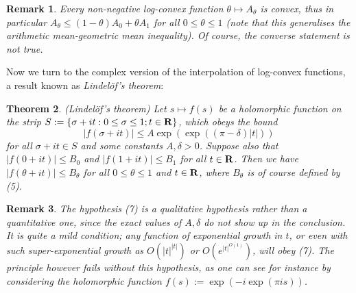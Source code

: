 \documentclass[10pt,reqno]{amsart}
\newtheorem{theorem}{Theorem}
\newtheorem{remark}[theorem]{Remark}
\begin{document}
\begin{remark}
    Every non-negative log-convex function $\theta \mapsto A_\theta$ is convex, thus in particular $A_\theta \leq (1-\theta) A_0 + \theta A_1$ for all $0 \leq \theta \leq 1$ (note that this generalises the arithmetic mean-geometric mean inequality). Of course, the converse statement is not true. 
\end{remark}

Now we turn to the complex version of the interpolation of log-convex functions, a result known as \emph{Lindelöf’s theorem}:

\begin{theorem}
    (Lindelöf’s theorem) Let $s \mapsto f(s)$ be a holomorphic function on the strip $S := \{ \sigma+it: 0 \leq \sigma \leq 1; t \in {\bf R} \}$, which obeys the bound
    \begin{equation}     |f(\sigma+it)| \leq A \exp( \exp( (\pi - \delta) |t|) ) \end{equation}
    for all $\sigma+it \in S$ and some constants $A, \delta > 0$. Suppose also that $|f(0+it)| \leq B_0$ and $|f(1+it)| \leq B_1$ for all $t \in {\bf R}$. Then we have $|f(\theta+it)| \leq B_\theta$ for all $0 \leq \theta \leq 1$ and $t \in {\bf R}$, where $B_\theta$ is of course defined by (5). 
\end{theorem}

\begin{remark}
    The hypothesis (7) is a qualitative hypothesis rather than a quantitative one, since the exact values of $A, \delta$ do not show up in the conclusion. It is quite a mild condition; any function of exponential growth in $t$, or even with such super-exponential growth as $O( |t|^{|t|})$ or $O(e^{|t|^{O(1)}})$, will obey (7). The principle however fails without this hypothesis, as one can see for instance by considering the holomorphic function $f(s) := \exp( - i \exp(\pi i s) )$. 
\end{remark}
\end{document}

